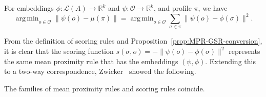 \documentclass[prodmode,acmec]{ec-acmsmall}
\newcommand{\calL}{{\mathcal{L}}}
\newcommand{\rank}{{\calL(A)}}
\newcommand{\calO}{{\mathcal{O}}}
\DeclareMathOperator*{\argmin}{arg\,min}
\begin{document}
\begin{proposition}
For embeddings $\phi : \rank \rightarrow \mathbb{R}^k$ and $\psi: \calO \to \mathbb{R}^k$, and profile $\pi$, we have
\begin{equation}
\argmin_{o \in \calO} \|\psi(o)-\mu(\pi)\| = \argmin_{o \in \calO} \sum_{\sigma \in \pi} \|\psi(o)-\phi(\sigma)\|^2.
\label{eqn:discrete-mean}
\end{equation}
\label{prop:MPR-GSR-conversion}
\end{proposition}
%
From the definition of scoring rules and Proposition~\ref{prop:MPR-GSR-conversion}, it is clear that the scoring function $s(\sigma,o) = -\|\psi(o)-\phi(\sigma)\|^2$ represents the same mean proximity rule that has the embeddings $(\psi,\phi)$. Extending this to a two-way correspondence, Zwicker~ showed the following. 
\begin{proposition}
The families of mean proximity rules and scoring rules coincide. 
\label{prop:equiv}
\end{proposition}
\end{document}
